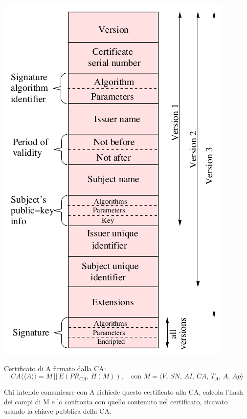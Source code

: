 \documentclass[a4paper, 11pt, notitlepage, fleqn]{report}
\newcommand{\llangle}{\langle\!\langle}
\newcommand{\rrangle}{\rangle\!\rangle}
\begin{document}
\begin{minipage}{.45\textwidth}
	\centering
	\includegraphics[width=.95\textwidth]{images/X509}
\end{minipage}
\vspace{2em}

\noindent
Certificato di A firmato dalla CA:
\begin{equation*}
	CA\llangle A\rrangle = M \,||\, E(PR_{CA},\,H(M)),\quad
	\mbox{con } M = \langle V,\,SN,\,AI,\,CA,\,T_A,\,A,\,Ap\rangle
\end{equation*}

Chi intende comunicare con A richiede questo certificato alla CA, calcola l'hash dei campi di M e lo confronta con quello contenuto nel certificato, ricavato usando la chiave pubblica della CA.
\end{document}
